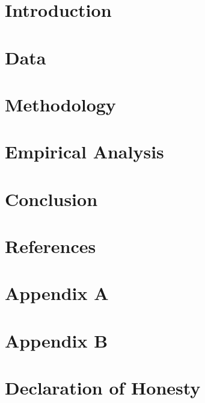 \documentclass[12pt]{article}
\begin{document}

\newpage
\pagestyle{plain}

\tableofcontents

\newpage

\listoftables

\newpage

\listoffigures

\newpage


\section{Introduction}


\section{Data}


\section{Methodology}


\section{Empirical Analysis}


\section{Conclusion}


\clearpage
\section*{References}
%
	\printbibliography[heading = none]
\clearpage
\section*{Appendix A}
%

\clearpage
\section*{Appendix B}
%

\clearpage

\clearpage
\section*{Declaration of Honesty}

\end{document}
